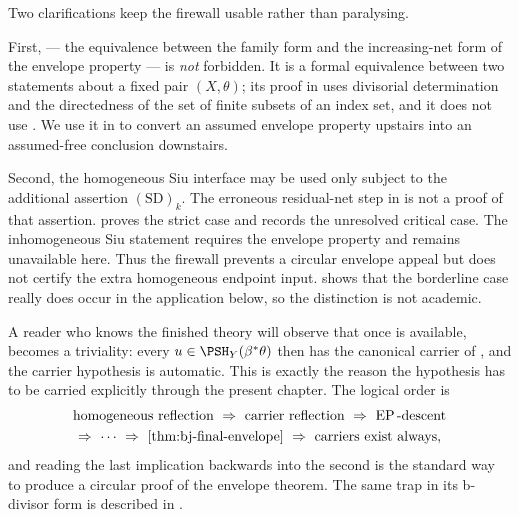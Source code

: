 Two clarifications keep the firewall usable rather than paralysing.

First,  --- the equivalence between
the family form and the increasing-net form of the envelope property --- is
\emph{not} forbidden.  It is a formal equivalence between two statements
about a fixed pair $(X,\theta)$; its proof in
 uses divisorial determination and the
directedness of the set of finite subsets of an index set, and it does not
use .  We use it in
 to convert an assumed envelope property
upstairs into an assumed-free conclusion downstairs.

Second, the homogeneous Siu interface
 may be used only subject to the
additional assertion $\mathrm{(SD)}_k$. The erroneous residual-net step
in \cite[Theorem~6.21]{BJ22} is not a proof of that assertion.
 proves the strict case and records
the unresolved critical case. The inhomogeneous Siu statement requires
the envelope property and remains unavailable here. Thus the firewall
prevents a circular envelope appeal but does not certify the extra
homogeneous endpoint input.
 shows that the borderline case really
does occur in the application below, so the distinction is not academic.

\begin{remark}
\label{rem:ch39-firewall-not-vacuous}
A reader who knows the finished theory will observe that once
 is available, 
becomes a triviality: every $u\in\PSH_Y(\beta^*\theta)$ then has the
canonical carrier of , and the carrier
hypothesis is automatic.  This is exactly the reason the hypothesis has to
be carried explicitly through the present chapter.  The logical order is
\[
 \begin{gathered}
 \text{homogeneous reflection}
 \ \Rightarrow\
 \text{carrier reflection}
 \ \Rightarrow\
 \operatorname{EP}\text{-descent}\\
 \Rightarrow\ \cdots\ \Rightarrow\
 \Cref{thm:bj-final-envelope}
 \ \Rightarrow\
 \text{carriers exist always},
 \end{gathered}
\]
and reading the last implication backwards into the second is the standard
way to produce a circular proof of the envelope theorem.  The same trap in
its b-divisor form is described in
.
\end{remark}

